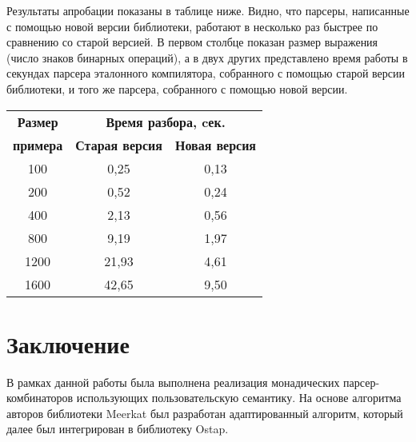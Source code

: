 \documentclass[conference]{IEEEtran}
\begin{document}
Результаты апробации показаны в таблице ниже. Видно, что парсеры, написанные с помощью новой версии библиотеки, работают в несколько раз быстрее по сравнению со старой версией.
В первом столбце показан размер выражения (число знаков бинарных операций), а в двух других представлено время работы в секундах парсера эталонного компилятора, собранного с помощью старой версии библиотеки, и того же парсера, собранного с помощью новой версии.

\begin{table}[htbp]
\begin{center}
\begin{tabular}{|c|c|c|}
\hline
\textbf{Размер} & \multicolumn{2}{|c|}{\textbf{Время разбора, cек.}} \\
\cline{2-3}
\textbf{примера} & \textbf{Старая версия} & \textbf{Новая версия} \\
\hline
100& 0,25& 0,13 \\
\hline
200& 0,52& 0,24 \\
\hline
400& 2,13& 0,56 \\
\hline
800& 9,19& 1,97 \\
\hline
1200& 21,93& 4,61 \\
\hline
1600& 42,65& 9,50 \\
\hline
\end{tabular}
\vskip3mm
\label{tab1}
\end{center}\vspace{-10mm}
\end{table}


\section{Заключение}

В рамках данной работы была выполнена реализация монадических парсер-комбинаторов использующих пользовательскую семантику. На основе алгоритма авторов библиотеки Meerkat был
разработан адаптированный алгоритм, который далее был интегрирован в библиотеку Ostap.
\end{document}
